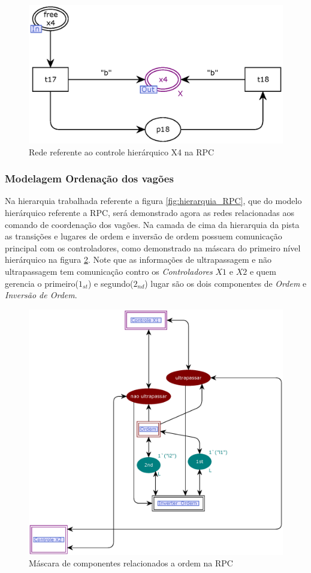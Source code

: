 \begin{figure}[ht]
    \centering
    \caption{Rede referente ao controle hierárquico X4 na RPC}
    \label{fig:controle_x4}
    \includegraphics[width=0.6\linewidth]{figures//Simulation//Modelagem/controle_x4.eps}
\end{figure}

\clearpage 
\subsubsection{Modelagem Ordenação dos vagões}
\label{sub:model_ord}
Na hierarquia trabalhada referente a figura \ref{fig:hierarquia_RPC}, que do modelo hierárquico referente a RPC, será demonstrado agora as redes relacionadas aos comando de coordenação dos vagões. Na camada de cima da hierarquia da pista as transições e lugares de ordem e inversão de ordem possuem comunicação principal com os controladores, como demonstrado na máscara do primeiro nível hierárquico na figura \ref{fig:pista_ordem}. Note que as informações de ultrapassagem e não ultrapassagem tem comunicação contro os \textit{Controladores} $X1$ e $X2$ e quem gerencia o primeiro($1_{st}$) e segundo($2_{nd}$) lugar são os dois componentes de \textit{Ordem} e\textit{ Inversão de Ordem}.

\begin{figure}[ht]
    \centering
    \caption{Máscara de componentes relacionados a ordem na RPC}
    \label{fig:pista_ordem}
    \includegraphics[width=0.8\linewidth]{figures//Simulation//Modelagem/pista_ordem.eps}
\end{figure}

